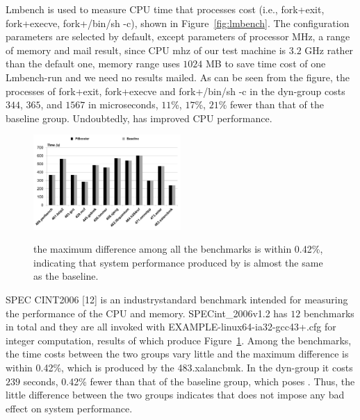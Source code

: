Lmbench is used to measure CPU time that processes cost (i.e., fork+exit, fork+execve, fork+/bin/sh -c), shown in Figure~\ref{fig:lmbench}. The configuration parameters are selected by default, except parameters of processor MHz, a range of memory and mail result, since CPU mhz of our test machine is $3.2$ GHz rather than the default one, memory range uses $1024$ MB to save time cost of one Lmbench-run and we need no results mailed. As can be seen from the figure, the processes of fork+exit, fork+execve and fork+/bin/sh -c in the dyn-\name group costs $344$, $365$, and $1567$ in microseconds, $11$\%, $17$\%, $21$\% fewer than that of the baseline group. Undoubtedly, \name has improved CPU performance.

\begin{figure}[htp]
\centering
\includegraphics[width=0.5\textwidth]{image/macro/spec.png} \\
\caption{the maximum difference among all the benchmarks is within 0.42\%, indicating that system performance produced by \name is almost the same as the baseline.}
\label{fig:spec}
\end{figure}

SPEC CINT2006 [12] is an industrystandard
benchmark intended for measuring the performance of the CPU and
memory.
SPECint\_2006v1.2 has $12$ benchmarks in total and they are all invoked with EXAMPLE-linux64-ia32-gcc43+.cfg for integer computation, results of which produce Figure~\ref{fig:spec}. Among the benchmarks, the time costs between the two groups vary little and the maximum difference is within 0.42\%, which is produced by the 483.xalancbmk. In the dyn-\name group it costs $239$ seconds, 0.42\% fewer than that of the baseline group, which poses . Thus, the little difference between the two groups indicates that \name does not impose any bad effect on system performance.





